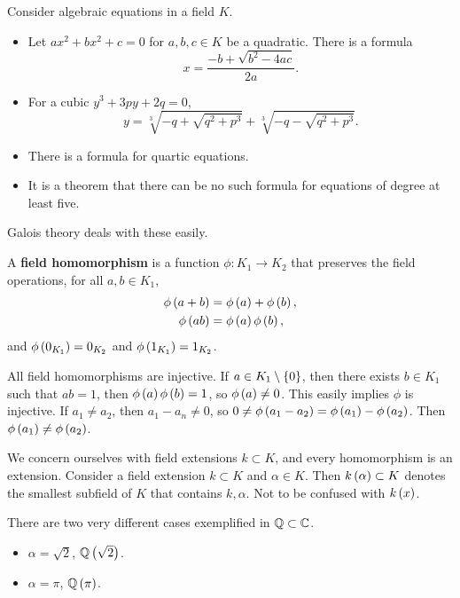 \begin{example*}
Consider algebraic equations in a field $ K $.
\begin{itemize}
\item Let $ ax^2 + bx^2 + c = 0 $ for $ a, b, c \in K $ be a quadratic. There is a formula
$$ x = \dfrac{-b + \sqrt{b^2 - 4ac}}{2a}. $$
\item For a cubic $ y^3 + 3py + 2q = 0 $,
$$ y = \sqrt[3]{-q + \sqrt{q^2 + p^3}} + \sqrt[3]{-q - \sqrt{q^2 + p^3}}. $$
\item There is a formula for quartic equations.
\item It is a theorem that there can be no such formula for equations of degree at least five.
\end{itemize}
Galois theory deals with these easily.
\end{example*}


\begin{definition}
A \textbf{field homomorphism} is a function $ \phi : K_1 \to K_2 $ that preserves the field operations, for all $ a, b \in K_1 $,
\begin{align*}
\phi\left( a + b \right) & = \phi\left( a \right) + \phi\left( b \right), \\
\phi\left( ab \right) & = \phi\left( a \right)\phi\left( b \right),
\end{align*}
and $ \phi\left( 0_{K_1} \right) = 0_{K_2} $ and $ \phi\left( 1_{K_1} \right) = 1_{K_2} $.
\end{definition}

\begin{remark*}
All field homomorphisms are injective. If $ a \in K_1 \setminus \left\{ 0 \right\} $, then there exists $ b \in K_1 $ such that $ ab = 1 $, then $ \phi\left( a \right)\phi\left( b \right) = 1 $, so $ \phi\left( a \right) \ne 0 $. This easily implies $ \phi $ is injective. If $ a_1 \ne a_2 $, then $ a_1 - a_n \ne 0 $, so $ 0 \ne \phi\left( a_1 - a_2 \right) = \phi\left( a_1 \right) - \phi\left( a_2 \right) $. Then $ \phi\left( a_1 \right) \ne \phi\left( a_2 \right) $.
\end{remark*}

We concern ourselves with field extensions $ k \subset K $, and every homomorphism is an extension. Consider a field extension $ k \subset K $ and $ \alpha \in K $. Then $ k\left( \alpha \right) \subset K $ denotes the smallest subfield of $ K $ that contains $ k, \alpha $. Not to be confused with $ k\left( x \right) $.

\begin{example*}
There are two very different cases exemplified in $ \mathbb{Q} \subset \mathbb{C} $.
\begin{itemize}
\item $ \alpha = \sqrt{2} $, $ \mathbb{Q}\left( \sqrt{2} \right) $.
\item $ \alpha = \pi $, $ \mathbb{Q}\left( \pi \right) $.
\end{itemize}
\end{example*}

